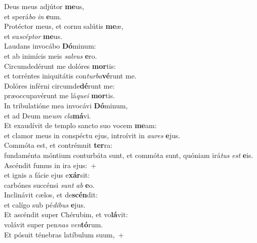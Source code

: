 \evenverse Deus meus adjútor \textbf{me}us,~\*\\
\evenverse et sperá\textit{bo} \textit{in} \textbf{e}um.\\
\oddverse Protéctor meus, et cornu salútis \textbf{me}æ,~\*\\
\oddverse et su\textit{scép}\textit{tor} \textbf{me}us.\\
\evenverse Laudans invocábo \textbf{Dó}minum:~\*\\
\evenverse et ab inimícis meis \textit{sal}\textit{vus} \textbf{e}ro.\\
\oddverse Circumdedérunt me dolóres \textbf{mor}tis:~\*\\
\oddverse et torréntes iniquitátis con\textit{tur}\textit{ba}\textbf{vé}runt me.\\
\evenverse Dolóres inférni circumde\textbf{dé}runt me:~\*\\
\evenverse præoccupavérunt me lá\textit{que}\textit{i} \textbf{mor}tis.\\
\oddverse In tribulatióne mea invocávi \textbf{Dó}minum,~\*\\
\oddverse et ad Deum me\textit{um} \textit{cla}\textbf{má}vi.\\
\evenverse Et exaudívit de templo sancto suo vocem \textbf{me}am:~\*\\
\evenverse et clamor meus in conspéctu ejus, introívit in \textit{au}\textit{res} \textbf{e}jus.\\
\oddverse Commóta est, et contrémuit \textbf{ter}ra:~\*\\
\oddverse fundaménta móntium conturbáta sunt, et commóta sunt, quóniam irá\textit{tus} \textit{est} \textbf{e}is.\\
\evenverse Ascéndit fumus in ira ejus:~+\\
\evenverse  et ignis a fácie ejus e\textbf{xár}sit:~\*\\
\evenverse carbónes succénsi \textit{sunt} \textit{ab} \textbf{e}o.\\
\oddverse Inclinávit cælos, et de\textbf{scén}dit:~\*\\
\oddverse et calígo sub pé\textit{di}\textit{bus} \textbf{e}jus.\\
\evenverse Et ascéndit super Chérubim, et vo\textbf{lá}vit:~\*\\
\evenverse volávit super pen\textit{nas} \textit{ven}\textbf{tó}rum.\\
\oddverse Et pósuit ténebras latíbulum suum,~+\\
